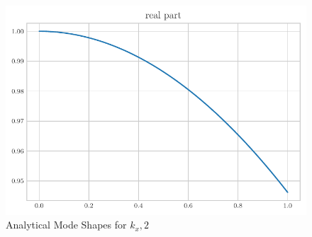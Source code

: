\documentclass[a4paper]{article}
\begin{document}
 \begin{figure}[h!]
     \centering
     \includegraphics{k_x_2_re.pdf}
     \caption{Analytical Mode Shapes for $k_x,2$}
     \label{fig:kx0}
 \end{figure}
\end{document}
